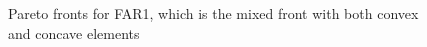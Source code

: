 \documentclass[11pt,oneside,onecolumn,openright]{article}
\begin{document}
   \begin{figure}[t]
  \centering\cprotect
   \cprotect {}
  \caption{Pareto fronts for FAR1, which is the mixed front with both convex and concave elements}
  \label{fig:far1_eg}
  \end{figure}
\end{document}
